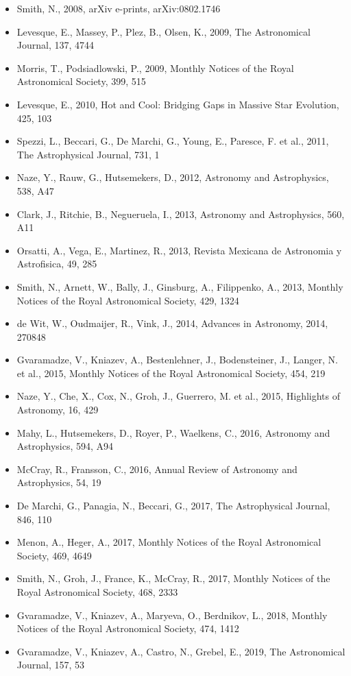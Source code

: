\documentclass{letter}
\begin{document}
\begin{enumerate}
\begin{itemize}
\item Smith, N., 2008, arXiv e-prints, arXiv:0802.1746
\item Levesque, E., Massey, P., Plez, B., Olsen, K., 2009, The Astronomical Journal, 137, 4744
\item Morris, T., Podsiadlowski, P., 2009, Monthly Notices of the Royal Astronomical Society, 399, 515
\item Levesque, E., 2010, Hot and Cool: Bridging Gaps in Massive Star Evolution, 425, 103
\item Spezzi, L., Beccari, G., De Marchi, G., Young, E., Paresce, F. et al., 2011, The Astrophysical Journal, 731, 1
\item Naze, Y., Rauw, G., Hutsemekers, D., 2012, Astronomy and Astrophysics, 538, A47
\item Clark, J., Ritchie, B., Negueruela, I., 2013, Astronomy and Astrophysics, 560, A11
\item Orsatti, A., Vega, E., Martinez, R., 2013, Revista Mexicana de Astronomia y Astrofisica, 49, 285
\item Smith, N., Arnett, W., Bally, J., Ginsburg, A., Filippenko, A., 2013, Monthly Notices of the Royal Astronomical Society, 429, 1324
\item de Wit, W., Oudmaijer, R., Vink, J., 2014, Advances in Astronomy, 2014, 270848
\item Gvaramadze, V., Kniazev, A., Bestenlehner, J., Bodensteiner, J., Langer, N. et al., 2015, Monthly Notices of the Royal Astronomical Society, 454, 219
\item Naze, Y., Che, X., Cox, N., Groh, J., Guerrero, M. et al., 2015, Highlights of Astronomy, 16, 429
\item Mahy, L., Hutsemekers, D., Royer, P., Waelkens, C., 2016, Astronomy and Astrophysics, 594, A94
\item McCray, R., Fransson, C., 2016, Annual Review of Astronomy and Astrophysics, 54, 19
\item De Marchi, G., Panagia, N., Beccari, G., 2017, The Astrophysical Journal, 846, 110
\item Menon, A., Heger, A., 2017, Monthly Notices of the Royal Astronomical Society, 469, 4649
\item Smith, N., Groh, J., France, K., McCray, R., 2017, Monthly Notices of the Royal Astronomical Society, 468, 2333
\item Gvaramadze, V., Kniazev, A., Maryeva, O., Berdnikov, L., 2018, Monthly Notices of the Royal Astronomical Society, 474, 1412
\item Gvaramadze, V., Kniazev, A., Castro, N., Grebel, E., 2019, The Astronomical Journal, 157, 53

\end{itemize}
\end{enumerate}
\end{document}
